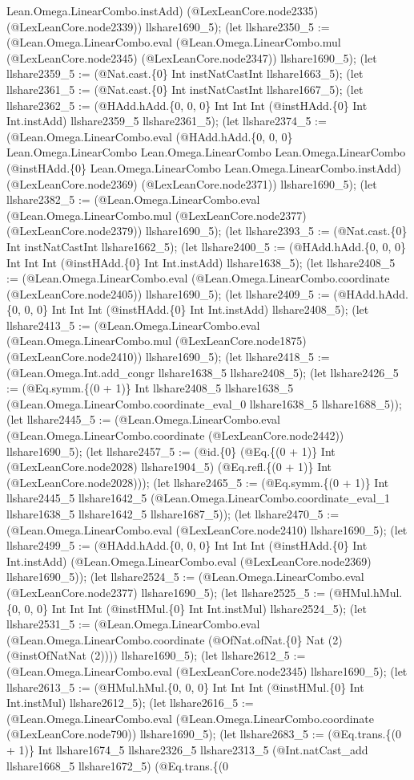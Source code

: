 \documentclass[11pt]{article}
\begin{document}
Lean.Omega.LinearCombo.instAdd) (@LexLeanCore.node2335) (@LexLeanCore.node2339)) llshare1690\_5); (let llshare2350\_5 := (@Lean.Omega.LinearCombo.eval (@Lean.Omega.LinearCombo.mul (@LexLeanCore.node2345) (@LexLeanCore.node2347)) llshare1690\_5); (let llshare2359\_5 := (@Nat.cast.\{0\} Int instNatCastInt llshare1663\_5); (let llshare2361\_5 := (@Nat.cast.\{0\} Int instNatCastInt llshare1667\_5); (let llshare2362\_5 := (@HAdd.hAdd.\{0, 0, 0\} Int Int Int (@instHAdd.\{0\} Int Int.instAdd) llshare2359\_5 llshare2361\_5); (let llshare2374\_5 := (@Lean.Omega.LinearCombo.eval (@HAdd.hAdd.\{0, 0, 0\} Lean.Omega.LinearCombo Lean.Omega.LinearCombo Lean.Omega.LinearCombo (@instHAdd.\{0\} Lean.Omega.LinearCombo Lean.Omega.LinearCombo.instAdd) (@LexLeanCore.node2369) (@LexLeanCore.node2371)) llshare1690\_5); (let llshare2382\_5 := (@Lean.Omega.LinearCombo.eval (@Lean.Omega.LinearCombo.mul (@LexLeanCore.node2377) (@LexLeanCore.node2379)) llshare1690\_5); (let llshare2393\_5 := (@Nat.cast.\{0\} Int instNatCastInt llshare1662\_5); (let llshare2400\_5 := (@HAdd.hAdd.\{0, 0, 0\} Int Int Int (@instHAdd.\{0\} Int Int.instAdd) llshare1638\_5); (let llshare2408\_5 := (@Lean.Omega.LinearCombo.eval (@Lean.Omega.LinearCombo.coordinate (@LexLeanCore.node2405)) llshare1690\_5); (let llshare2409\_5 := (@HAdd.hAdd.\{0, 0, 0\} Int Int Int (@instHAdd.\{0\} Int Int.instAdd) llshare2408\_5); (let llshare2413\_5 := (@Lean.Omega.LinearCombo.eval (@Lean.Omega.LinearCombo.mul (@LexLeanCore.node1875) (@LexLeanCore.node2410)) llshare1690\_5); (let llshare2418\_5 := (@Lean.Omega.Int.add\_congr llshare1638\_5 llshare2408\_5); (let llshare2426\_5 := (@Eq.symm.\{(0 + 1)\} Int llshare2408\_5 llshare1638\_5 (@Lean.Omega.LinearCombo.coordinate\_eval\_0 llshare1638\_5 llshare1688\_5)); (let llshare2445\_5 := (@Lean.Omega.LinearCombo.eval (@Lean.Omega.LinearCombo.coordinate (@LexLeanCore.node2442)) llshare1690\_5); (let llshare2457\_5 := (@id.\{0\} (@Eq.\{(0 + 1)\} Int (@LexLeanCore.node2028) llshare1904\_5) (@Eq.refl.\{(0 + 1)\} Int (@LexLeanCore.node2028))); (let llshare2465\_5 := (@Eq.symm.\{(0 + 1)\} Int llshare2445\_5 llshare1642\_5 (@Lean.Omega.LinearCombo.coordinate\_eval\_1 llshare1638\_5 llshare1642\_5 llshare1687\_5)); (let llshare2470\_5 := (@Lean.Omega.LinearCombo.eval (@LexLeanCore.node2410) llshare1690\_5); (let llshare2499\_5 := (@HAdd.hAdd.\{0, 0, 0\} Int Int Int (@instHAdd.\{0\} Int Int.instAdd) (@Lean.Omega.LinearCombo.eval (@LexLeanCore.node2369) llshare1690\_5)); (let llshare2524\_5 := (@Lean.Omega.LinearCombo.eval (@LexLeanCore.node2377) llshare1690\_5); (let llshare2525\_5 := (@HMul.hMul.\{0, 0, 0\} Int Int Int (@instHMul.\{0\} Int Int.instMul) llshare2524\_5); (let llshare2531\_5 := (@Lean.Omega.LinearCombo.eval (@Lean.Omega.LinearCombo.coordinate (@OfNat.ofNat.\{0\} Nat (2) (@instOfNatNat (2)))) llshare1690\_5); (let llshare2612\_5 := (@Lean.Omega.LinearCombo.eval (@LexLeanCore.node2345) llshare1690\_5); (let llshare2613\_5 := (@HMul.hMul.\{0, 0, 0\} Int Int Int (@instHMul.\{0\} Int Int.instMul) llshare2612\_5); (let llshare2616\_5 := (@Lean.Omega.LinearCombo.eval (@Lean.Omega.LinearCombo.coordinate (@LexLeanCore.node790)) llshare1690\_5); (let llshare2683\_5 := (@Eq.trans.\{(0 + 1)\} Int llshare1674\_5 llshare2326\_5 llshare2313\_5 (@Int.natCast\_add llshare1668\_5 llshare1672\_5) (@Eq.trans.\{(0 
\end{document}
